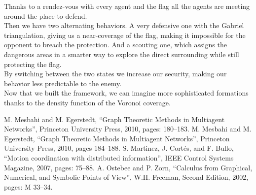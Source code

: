 \documentclass[journal]{IEEEtran}
\begin{document}
Thanks to a rendez-vous with every agent and the flag all the agents are meeting around the place to defend.\\
Then we have two alternating behaviors. A very defensive one with the Gabriel triangulation, giving us a near-coverage of the flag, making it impossible for the opponent to breach the protection. And a scouting one, which assigns the dangerous areas in a smarter way to explore the direct surrounding while still protecting the flag.\\

By switching between the two states we increase our security, making our behavior less predictable to the enemy.\\

Now that we built the framework, we can imagine more sophisticated formations thanks to the density function of the Voronoi coverage.


\begin{thebibliography}{00}
 M. Mesbahi and M. Egerstedt, ``Graph Theoretic Methods in Multiagent Networks'', Princeton University Press, 2010, pages: 180--183.
 M. Mesbahi and M. Egerstedt, ``Graph Theoretic Methods in Multiagent Networks'', Princeton University Press, 2010, pages 184--188.
 S. Martinez, J. Cortés, and F. Bullo, ``Motion coordination with distributed information'', IEEE Control Systems Magazine, 2007, pages: 75--88.
 A. Ostebee and P. Zorn, ``Calculus from Graphical, Numerical, and Symbolic Points of View'', W.H. Freeman, Second Edition, 2002, pages: M 33--34.
\end{thebibliography}
\end{document}
